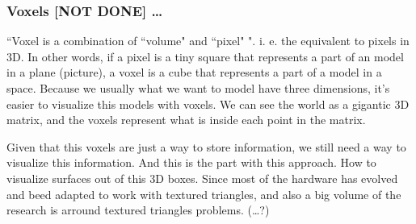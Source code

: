 
 \subsubsection{Voxels [NOT DONE] \dots} %
 \label{ssub:voxels}

``Voxel is a combination of ``volume" and ``pixel" ". i. e. the equivalent to pixels in 3D. In other words, if a pixel is a tiny square that represents a part of an model in a plane (picture), a voxel is a cube that represents a part of a model in a space.
Because we usually what we want to model  have three dimensions, it's easier to visualize this models with voxels.
We can see the world as a gigantic 3D matrix, and the voxels represent what is inside each point in the matrix.

Given that this voxels are just a way to store information, we still need a way to visualize this information. And this is the \trikky part with this approach. How to visualize surfaces out of this 3D boxes. Since most of the hardware has evolved and beed adapted to work with textured triangles, and also a big volume of the research is arround textured triangles problems.
(\dots?)
